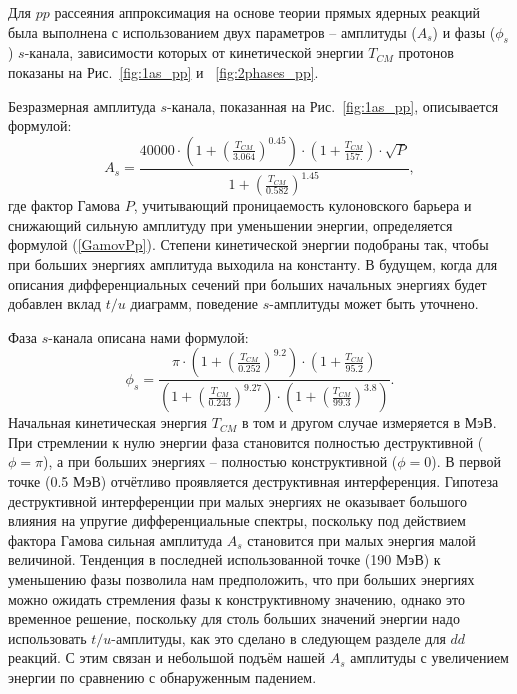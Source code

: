 \documentclass[a4paper,12pt]{article}
\begin{document}
\begin{large}
Для $pp$ рассеяния аппроксимация на основе теории прямых ядерных реакций была выполнена с использованием двух параметров -- амплитуды ($A_s$) и фазы ($\phi_s$) $s$-канала, зависимости которых от кинетической энергии $T_{CM}$ протонов показаны на Рис.~\ref{fig:1as_pp} и ~\ref{fig:2phases_pp}.

Безразмерная амплитуда $s$-канала, показанная на Рис.~\ref{fig:1as_pp}, описывается формулой:
\begin{equation} 
  \label{AmplitudeSp}
   A_s= \frac{ 40000 \cdot \left( 1 + \left(\frac{T_{CM}}{3.064}\right)^{0.45} \right) \cdot \left( 1 + \frac{T_{CM}}{157.} \right) \cdot \sqrt{P} }{1 + \left( \frac{T_{CM}}{0.582}\right)^{1.45}},
\end{equation}
где фактор Гамова $P$, учитывающий проницаемость кулоновского барьера и снижающий сильную амплитуду при уменьшении энергии, определяется формулой (\ref{GamovPp}).
  Степени кинетической энергии подобраны так, чтобы при больших энергиях амплитуда выходила на константу.
  В будущем, когда для описания дифференциальных сечений при больших начальных энергиях будет добавлен вклад $t/u$ диаграмм, поведение $s$-амплитуды может быть уточнено.

Фаза $s$-канала описана нами формулой:
\begin{equation}
  \label{Phasesp}
  \phi_s= \frac{ \pi \cdot \left( 1 + \left(\frac{T_{CM}}{0.252} \right)^{9.2} \right) \cdot \left( 1 + \frac{T_{CM}}{95.2} \right) }{ \left( 1 + \left( \frac{T_{CM}}{0.243} \right)^{9.27} \right) \cdot \left( 1 + \left(\frac{T_{CM}}{99.3}\right)^{3.8} \right) }.
\end{equation}
  Начальная кинетическая энергия $T_{CM}$ в том и другом случае измеряется в МэВ.
  При стремлении к нулю энергии фаза становится полностью деструктивной ($\phi=\pi$), а при больших энергиях -- полностью конструктивной ($\phi=0$).
  В первой точке (0.5 МэВ) отчётливо проявляется деструктивная интерференция.
  Гипотеза деструктивной интерференции при малых энергиях не оказывает большого влияния на упругие дифференциальные спектры, поскольку под действием фактора Гамова сильная амплитуда $A_s$ становится при малых энергия малой величиной.
  Тенденция в последней использованной точке (190 МэВ) к уменьшению фазы позволила нам предположить, что при больших энергиях можно ожидать стремления фазы к конструктивному значению, однако это временное решение, поскольку для столь больших значений энергии надо использовать $t/u$-амплитуды, как это сделано в следующем разделе для $dd$ реакций.
  С этим связан и небольшой подъём нашей $A_s$ амплитуды с увеличением энергии по сравнению с обнаруженным падением.


\end{large}
\end{document}
